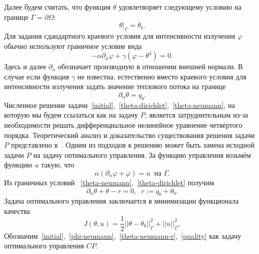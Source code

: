 \documentclass[10pt]{article}
\begin{document}
    Далее будем считать, что функция $\theta$ удовлетворяет следующему условию на границе
    $\Gamma = \partial \Omega$:
    \begin{equation}
        \label{theta-dirichlet}
        \theta|_\Gamma = \theta_b.
    \end{equation}
    Для задания сдандартного краевого условия для интенсивности излучения $\varphi$ обычно
    используют граничное условие вида
    \begin{equation}
        \label{phi-default}
        - \alpha \partial_n \varphi + \gamma (\varphi - \theta ^4) = 0.
    \end{equation}
    Здесь и далее $\partial_n$ обозначает производную в отношении внешней нормали.
    В случае если функция $\gamma$ не известна, естественно вместо краевого условия для
    интенсивности излучения задать значение теплового потока на границе
    \begin{equation}
        \label{theta-neumann}
        \partial_n \theta = q_b.
    \end{equation}
    Численное решение
    задачи~\eqref{initial},~\eqref{theta-dirichlet},~\eqref{theta-neumann},
    на которую мы будем ссылаться как на задачу $P$, является затруднительным из-за необходимости
    решать дифференциальное нелинейное уравнение четвёртого порядка.
    Теоретический анализ и доказательство существования решения задачи $P$ представлено
    в~\cite{cheb-same}.
    Одним из подходов к решению может быть замена исходной задачи $P$ на задачу
    оптимального управления.
    За функцию управления возьмём функцию $u$ такую, что
    \begin{equation}
        \label{phi-boundary}
        \alpha (\partial_n \varphi + \varphi) = u \;\; \text{на } \Gamma.
    \end{equation}
    Из граничных условий ~\eqref{theta-neumann},~\eqref{theta-dirichlet} получим
    \begin{equation}
        \label{theta-boundary}
        \partial_n \theta  + \theta - r = 0, \;\; r := q_b + \theta_b.
    \end{equation}
    Задача оптимального управления заключается в минимизации функционала качества
    \begin{equation}
        \label{quality}
        J(\theta, u) = \frac{1}{2} ||\theta - \theta_b||^2_\Gamma + ||u||^2_\Gamma,
    \end{equation}
    Обозначим~\eqref{initial},~\eqref{phi-neumann},~\eqref{theta-neumann-r},~\eqref{quality}
    как задачу оптимального управления $CP$.
\end{document}

